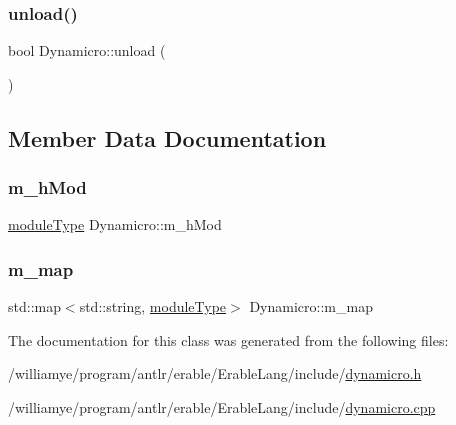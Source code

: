 \mbox{\label{class_dynamicro_a80f1cc3d7f5a22c7ef0824ac86cd36c1}} 
\subsubsection{\texorpdfstring{unload()}{unload()}}
{\footnotesize\ttfamily bool Dynamicro\+::unload (\begin{DoxyParamCaption}{ }\end{DoxyParamCaption})}



\subsection{Member Data Documentation}
\mbox{\label{class_dynamicro_aa4012590c2140283b7d74dbc47f6ba72}} 
\subsubsection{\texorpdfstring{m\_hMod}{m\_hMod}}
{\footnotesize\ttfamily \mbox{\hyperlink{class_dynamicro_a8476681e7880be183a320960f3373a47}{module\+Type}} Dynamicro\+::m\+\_\+h\+Mod\hspace{0.3cm}{\ttfamily [private]}}

\mbox{\label{class_dynamicro_ad90c1bb73dfca18828f8a874ecaab102}} 
\subsubsection{\texorpdfstring{m\_map}{m\_map}}
{\footnotesize\ttfamily std\+::map$<$std\+::string, \mbox{\hyperlink{class_dynamicro_a8476681e7880be183a320960f3373a47}{module\+Type}}$>$ Dynamicro\+::m\+\_\+map\hspace{0.3cm}{\ttfamily [private]}}



The documentation for this class was generated from the following files\+:\begin{DoxyCompactItemize}
\item 
/williamye/program/antlr/erable/\+Erable\+Lang/include/\mbox{\hyperlink{dynamicro_8h}{dynamicro.\+h}}\item 
/williamye/program/antlr/erable/\+Erable\+Lang/include/\mbox{\hyperlink{dynamicro_8cpp}{dynamicro.\+cpp}}\end{DoxyCompactItemize}
